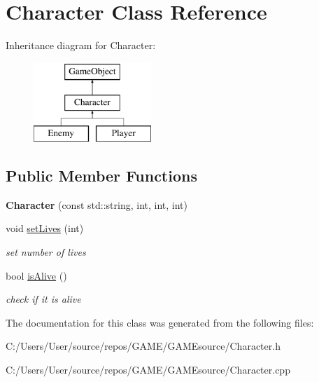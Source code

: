 \hypertarget{class_character}{}\section{Character Class Reference}
\label{class_character}
Inheritance diagram for Character\+:\begin{figure}[H]
\begin{center}
\leavevmode
\includegraphics[height=3.000000cm]{class_character}
\end{center}
\end{figure}
\subsection*{Public Member Functions}
\begin{DoxyCompactItemize}
\item 
\mbox{\label{class_character_a83f1f8a2eb47e7a891ef14e673703e15}} 
{\bfseries Character} (const std\+::string, int, int, int)
\item 
\mbox{\label{class_character_a5c979ca4dd41c717ff7f6a620c67c0ff}} 
void \mbox{\hyperlink{class_character_a5c979ca4dd41c717ff7f6a620c67c0ff}{set\+Lives}} (int)
\begin{DoxyCompactList}\small\item\em set number of lives \end{DoxyCompactList}\item 
\mbox{\label{class_character_aa49f985b1b05751b2d4b3de74b4acc8c}} 
bool \mbox{\hyperlink{class_character_aa49f985b1b05751b2d4b3de74b4acc8c}{is\+Alive}} ()
\begin{DoxyCompactList}\small\item\em check if it is alive \end{DoxyCompactList}\end{DoxyCompactItemize}


The documentation for this class was generated from the following files\+:\begin{DoxyCompactItemize}
\item 
C\+:/\+Users/\+User/source/repos/\+G\+A\+M\+E/\+G\+A\+M\+Esource/Character.\+h\item 
C\+:/\+Users/\+User/source/repos/\+G\+A\+M\+E/\+G\+A\+M\+Esource/Character.\+cpp\end{DoxyCompactItemize}
